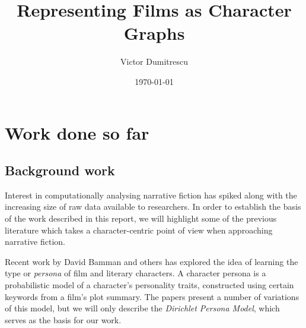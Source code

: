 \documentclass[bsc,frontabs,singlespacing,parskip]{infthesis} %
\begin{document}
\long{}

\title{Representing Films as Character Graphs}

\author{Victor Dumitrescu}


\date{\today}


\maketitle





\chapter{Work done so far}

\section{Background work}
Interest in computationally analysing narrative fiction has spiked along with the increasing size of raw data available to researchers. In order to establish the basis of the work described in this report, we will highlight some of the previous literature which takes a character-centric point of view when approaching narrative fiction.

Recent work by David Bamman and others has explored the idea of learning the type or \textit{persona} of film \cite{Bamman2013} and literary \cite{Bamman2014} characters. A character persona is a probabilistic model of a character's personality traits, constructed using certain keywords from a film's plot summary. The papers present a number of variations of this model, but we will only describe the \textit{Dirichlet Persona Model}, which serves as the basis for our work.
\end{document}
